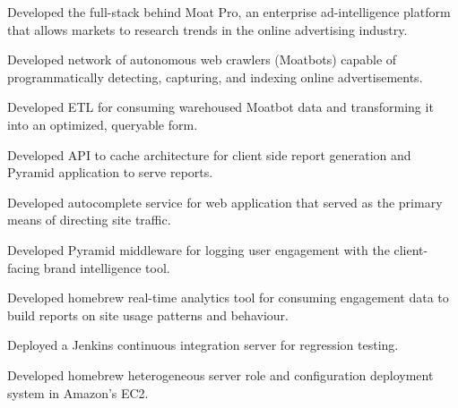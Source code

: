 \documentclass[]{deedy-resume-openfont}
\begin{document}
    \begin{tightemize}
        \item
            Developed the full-stack behind Moat Pro, an enterprise
            ad-intelligence platform that allows markets to research trends
            in the online advertising industry.
        \item
            Developed network of autonomous web crawlers (Moatbots) capable
            of programmatically detecting, capturing, and indexing online
            advertisements.
        \item
            Developed ETL for consuming warehoused Moatbot data and
            transforming it into an optimized, queryable form.
        \item
            Developed API to cache architecture for client side report
            generation and Pyramid application to serve reports.
        \item
            Developed autocomplete service for web application that served
            as the primary means of directing site traffic.
        \item
            Developed Pyramid middleware for logging user engagement with
            the client-facing brand intelligence tool.
        \item
            Developed homebrew real-time analytics tool for consuming
            engagement data to build reports on site usage patterns and
            behaviour.
        \item
            Deployed a Jenkins continuous integration server for
            regression testing.
        \item
            Developed homebrew heterogeneous server role and configuration
            deployment system in Amazon’s EC2.
    \end{tightemize}
\sectionsep
\end{document}
